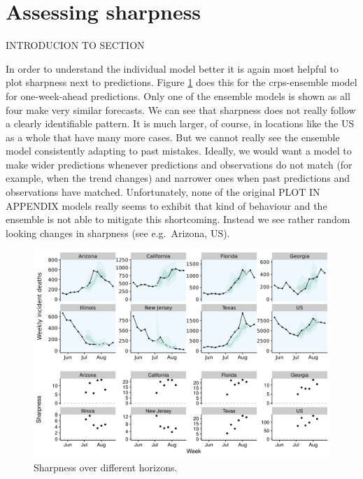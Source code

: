 \documentclass[
]{book}
\begin{document}
\hypertarget{assessing-sharpness}{%
\section{Assessing sharpness}\label{assessing-sharpness}}

INTRODUCION TO SECTION

In order to understand the individual model better it is again most helpful to plot sharpness next to predictions. Figure \ref{fig:sharpness-crps-ensemble} does this for the crps-ensemble model for one-week-ahead predictions. Only one of the ensemble models is shown as all four make very similar forecasts. We can see that sharpness does not really follow a clearly identifiable pattern. It is much larger, of course, in locations like the US as a whole that have many more cases. But we cannot really see the ensemble model consistently adapting to past mistakes. Ideally, we would want a model to make wider predictions whenever predictions and observations do not match (for example, when the trend changes) and narrower ones when past predictions and observations have matched. Unfortunately, none of the original PLOT IN APPENDIX models really seems to exhibit that kind of behaviour and the ensemble is not able to mitigate this shortcoming. Instead we see rather random looking changes in sharpness (see e.g.~Arizona, US).

\begin{figure}
\includegraphics[width=1\linewidth]{../visualisation/chapter-5-results/scenario-baseline/sharpness-predictions-ensemble} \caption{Sharpness over different horizons. }\label{fig:sharpness-crps-ensemble}
\end{figure}
\end{document}
